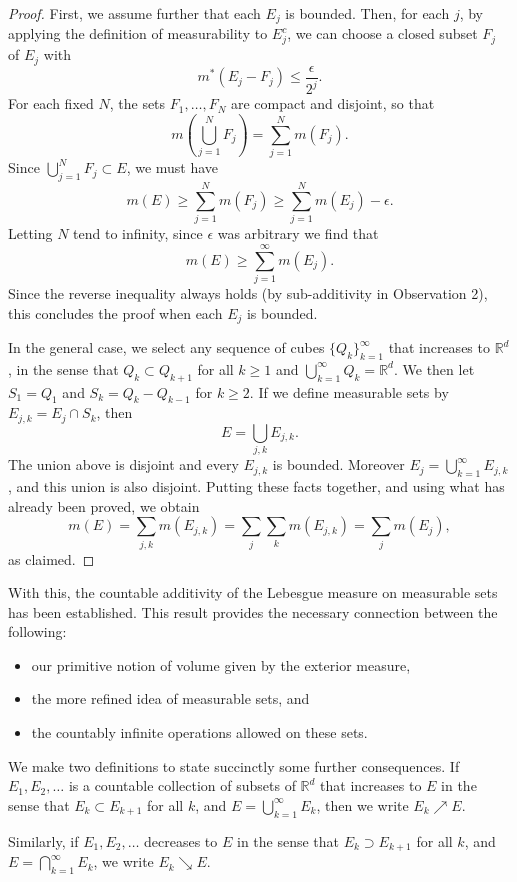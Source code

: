 \documentclass[11pt,openany]{book}
\begin{document}
\begin{proof}
First, we assume further that each $E_j$ is bounded. Then, for each $j$, by applying the definition of measurability to $E_j^c$, we can choose a closed subset $F_j$ of $E_j$ with
\[
 m^*(E_j-F_j)\le\frac{\epsilon}{2^j}.
\]
For each fixed $N$, the sets $F_1,\ldots,F_N$ are compact and disjoint, so that
\[
 m\left(\bigcup_{j=1}^N F_j\right)=\sum_{j=1}^N m(F_j).
\]
Since $\bigcup_{j=1}^N F_j\subset E$, we must have
\[
 m(E)\ge\sum_{j=1}^N m(F_j)
 \ge\sum_{j=1}^N m(E_j)-\epsilon.
\]
Letting $N$ tend to infinity, since $\epsilon$ was arbitrary we find that
\[
 m(E)\ge\sum_{j=1}^{\infty}m(E_j).
\]
Since the reverse inequality always holds (by sub-additivity in Observation 2), this concludes the proof when each $E_j$ is bounded.

In the general case, we select any sequence of cubes $\{Q_k\}_{k=1}^{\infty}$ that increases to $\mathbb{R}^d$, in the sense that $Q_k\subset Q_{k+1}$ for all $k\ge1$ and $\bigcup_{k=1}^{\infty}Q_k=\mathbb{R}^d$. We then let $S_1=Q_1$ and $S_k=Q_k-Q_{k-1}$ for $k\ge2$. If we define measurable sets by $E_{j,k}=E_j\cap S_k$, then
\[
 E=\bigcup_{j,k}E_{j,k}.
\]
The union above is disjoint and every $E_{j,k}$ is bounded. Moreover $E_j=\bigcup_{k=1}^{\infty}E_{j,k}$, and this union is also disjoint. Putting these facts together, and using what has already been proved, we obtain
\[
 m(E)=\sum_{j,k}m(E_{j,k})
 =\sum_j\sum_k m(E_{j,k})
 =\sum_j m(E_j),
\]
as claimed.
\end{proof}

With this, the countable additivity of the Lebesgue measure on measurable sets has been established. This result provides the necessary connection between the following:
\begin{itemize}
\item our primitive notion of volume given by the exterior measure,
\item the more refined idea of measurable sets, and
\item the countably infinite operations allowed on these sets.
\end{itemize}

We make two definitions to state succinctly some further consequences. If $E_1,E_2,\ldots$ is a countable collection of subsets of $\mathbb{R}^d$ that increases to $E$ in the sense that $E_k\subset E_{k+1}$ for all $k$, and $E=\bigcup_{k=1}^{\infty}E_k$, then we write $E_k\nearrow E$.

Similarly, if $E_1,E_2,\ldots$ decreases to $E$ in the sense that $E_k\supset E_{k+1}$ for all $k$, and $E=\bigcap_{k=1}^{\infty}E_k$, we write $E_k\searrow E$.
\end{document}
